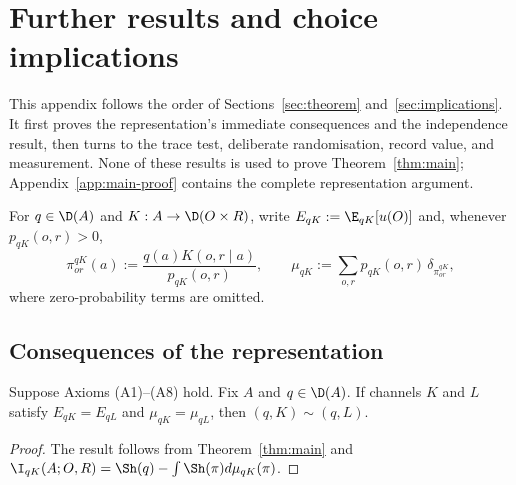 \section{Further results and choice implications}\label{app:auxiliary-results}

This appendix follows the order of Sections~\ref{sec:theorem}
and~\ref{sec:implications}.  It first proves the representation's immediate
consequences and the independence result, then turns to the trace test,
deliberate randomisation, record value, and measurement.  None of these
results is used to prove Theorem~\ref{thm:main}; Appendix~\ref{app:main-proof}
contains the complete representation argument.

For $q\in\D(A)$ and $K:A\to\D(O\times R)$, write
$E_{qK}:=\E_{qK}[u(O)]$ and, whenever $p_{qK}(o,r)>0$,
\[
 \pi^{qK}_{or}(a):=\frac{q(a)K(o,r\mid a)}{p_{qK}(o,r)},
 \qquad
 \mu_{qK}:=\sum_{o,r}p_{qK}(o,r)\,\delta_{\pi^{qK}_{or}},
\]
where zero-probability terms are omitted.

\subsection{Consequences of the representation}
\label{app:representation-consequences}

\begin{corollary}\label{cor:matching}
Suppose Axioms \textup{(A1)--(A8)} hold.  Fix $A$ and $q\in\D(A)$.  If channels $K$ and $L$ satisfy
$E_{qK}=E_{qL}$ and $\mu_{qK}=\mu_{qL}$, then $(q,K)\sim(q,L)$.
\end{corollary}

\begin{proof}
The result follows from Theorem~\ref{thm:main} and
$\I_{qK}(A;O,R)=\Sh(q)-\int\Sh(\pi)d\mu_{qK}(\pi)$.
\end{proof}

